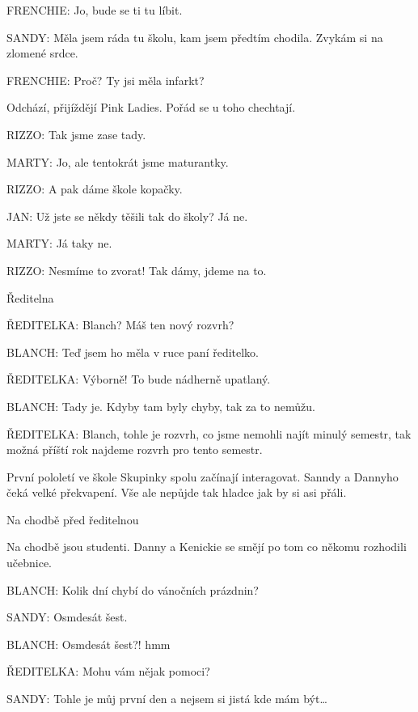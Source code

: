 \rep FRENCHIE:                Jo, bude se ti tu líbit.

\rep SANDY:                Měla jsem ráda tu školu, kam jsem předtím chodila. Zvykám si na  zlomené srdce.

\rep FRENCHIE:                Proč? Ty jsi měla infarkt?

\pop Odchází, přijíždějí Pink Ladies. Pořád se u toho chechtají.

\rep RIZZO:                Tak jsme zase tady.

\rep MARTY:                Jo, ale tentokrát jsme maturantky.

\rep RIZZO:                A pak dáme škole kopačky.

\rep JAN:                Už jste se někdy těšili tak do školy? Já ne.

\rep MARTY:                Já taky ne.

\rep RIZZO:                Nesmíme to zvorat! Tak dámy, jdeme na to.

\scene Ředitelna 

\rep ŘEDITELKA:                Blanch? Máš ten nový rozvrh?

\rep BLANCH:                 Teď jsem ho měla v ruce paní ředitelko. 

\rep ŘEDITELKA:                 Výborně! To bude nádherně upatlaný. 

\rep BLANCH:                Tady je. Kdyby tam byly chyby, tak za to nemůžu. 

\rep ŘEDITELKA:                Blanch, tohle je rozvrh, co jsme nemohli najít minulý semestr, tak   možná příští rok najdeme rozvrh pro tento semestr.

\act První pololetí ve škole
Skupinky spolu začínají interagovat. Sanndy a Dannyho čeká velké překvapení. Vše ale nepůjde tak hladce jak by si asi přáli.

\scene Na chodbě před ředitelnou

\pop Na chodbě jsou studenti. Danny a Kenickie se smějí po tom co někomu rozhodili učebnice.

\rep BLANCH:        Kolik dní chybí do vánočních prázdnin?

\rep SANDY:        Osmdesát šest.

\rep BLANCH:        Osmdesát šest?! hmm

\rep ŘEDITELKA:        Mohu vám nějak pomoci?

\rep SANDY:        Tohle je můj první den a nejsem si jistá kde mám být…


